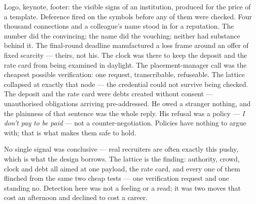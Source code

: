 \begin{lattice}
   Logo, keynote, footer: the visible signs of an institution, produced for the price of a template. Deference fired on the symbols before any of them were checked.
   Four thousand connections and a colleague's name stood in for a reputation. The number did the convincing; the name did the vouching; neither had substance behind it.
   The final-round deadline manufactured a loss frame around an offer of fixed scarcity --- theirs, not his. The clock was there to keep the deposit and the rate card from being examined in daylight.
   The placement-manager call was the cheapest possible verification: one request, transcribable, refuseable. The lattice collapsed at exactly that node --- the credential could not survive being checked.
   The deposit and the rate card were debts created without consent --- unauthorised obligations arriving pre-addressed. He owed a stranger nothing, and the plainness of that sentence was the whole reply.
   His refusal was a policy --- \emph{I don't pay to be paid} --- not a counter-negotiation. Policies have nothing to argue with; that is what makes them safe to hold.
\end{lattice}

\begin{lesson}
No single signal was conclusive --- real recruiters are often exactly this pushy, which is what the design borrows. The lattice is the finding: authority, crowd, clock and debt all aimed at one payload, the rate card, and every one of them flinched from the same two cheap tests --- one verification request and one standing no. Detection here was not a feeling or a read; it was two moves that cost an afternoon and declined to cost a career.
\end{lesson}
